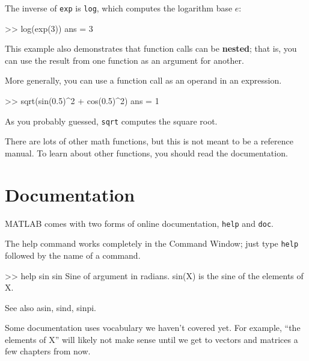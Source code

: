 \documentclass[main.tex]{subfiles}
\begin{document}

The inverse of {\tt exp} is {\tt log}, which computes the logarithm base $e$:

\begin{code}
>> log(exp(3))
ans = 3
\end{code}

This example also demonstrates that function calls can be {\bf nested};
that is, you can use the result from one function as an argument for
another.


More generally, you can use a function call as an operand in an expression.

\begin{code}
>> sqrt(sin(0.5)^2 + cos(0.5)^2)
ans = 1
\end{code}

As you probably guessed, {\tt sqrt} computes the square root.


There are lots of other math functions, but this is not meant to
be a reference manual.  To learn about other functions, you should
read the documentation.


\section{Documentation}

MATLAB comes with two forms of online documentation, {\tt help}
and {\tt doc}.


The help command works completely in the Command Window; just 
type {\tt help} followed by the name of a command.


\begin{stdout}
>> help sin
 sin    Sine of argument in radians.
    sin(X) is the sine of the elements of X.
 
    See also asin, sind, sinpi.
\end{stdout}

Some documentation uses vocabulary we haven't covered yet.  
For example, ``the elements of X'' will likely not make sense until
we get to vectors and matrices a few chapters from now.
\end{document}
